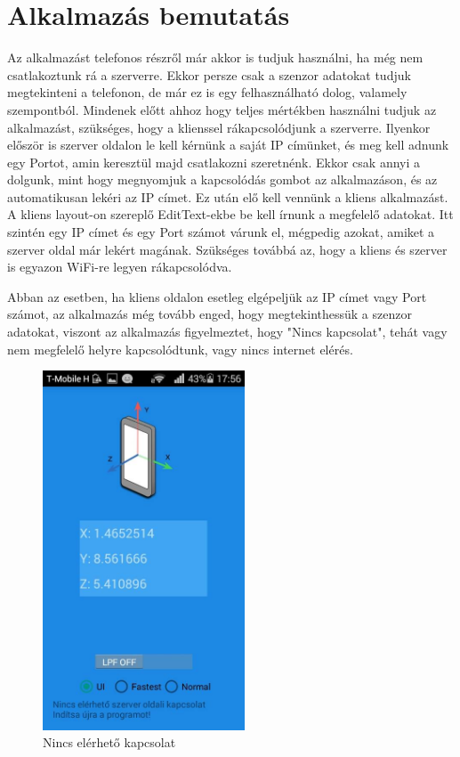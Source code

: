 \documentclass{thesis-ekf}
\theoremstyle{definition}
\theoremstyle{remark}
\begin{document}
\chapter{Alkalmazás bemutatás}
Az alkalmazást telefonos részről már akkor is tudjuk használni, ha még nem csatlakoztunk rá a szerverre. Ekkor persze csak a szenzor adatokat tudjuk megtekinteni a telefonon, de már ez is egy felhasználható dolog, valamely szempontból. Mindenek előtt ahhoz hogy teljes mértékben használni tudjuk az alkalmazást, szükséges, hogy a klienssel rákapcsolódjunk a szerverre. Ilyenkor először is szerver oldalon le kell kérnünk a saját IP címünket, és meg kell adnunk egy Portot, amin keresztül majd csatlakozni szeretnénk. Ekkor csak annyi a dolgunk, mint hogy megnyomjuk a kapcsolódás gombot az alkalmazáson, és az automatikusan lekéri az IP címet. Ez után elő kell vennünk a kliens alkalmazást. A kliens layout-on szereplő EditText-ekbe be kell írnunk a megfelelő adatokat. Itt szintén egy IP címet és egy Port számot várunk el, mégpedig azokat, amiket a szerver oldal már lekért magának. Szükséges továbbá az, hogy a kliens és szerver is egyazon WiFi-re legyen rákapcsolódva.
\par Abban az esetben, ha kliens oldalon esetleg elgépeljük az IP címet vagy Port számot, az alkalmazás még tovább enged, hogy megtekinthessük a szenzor adatokat, viszont az alkalmazás figyelmeztet, hogy "Nincs kapcsolat", tehát vagy nem megfelelő helyre kapcsolódtunk, vagy nincs internet elérés. 
\begin{figure}[!h]
	\centering
	\includegraphics[width=6cm]{nincskapcsolat}
	\caption{Nincs elérhető kapcsolat}\label{nincskapcsolat}
\end{figure}
\end{document}
